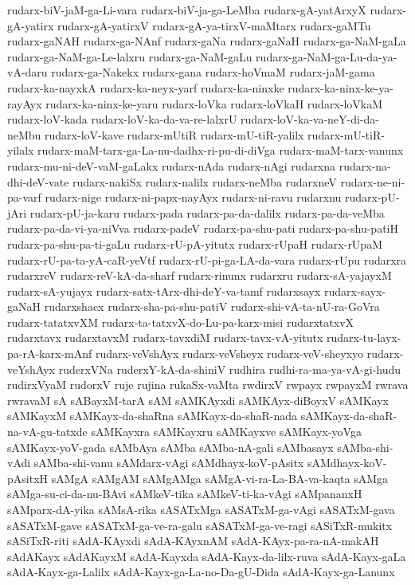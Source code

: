 {rudarx-biV-jaM-ga-Li-vara
rudarx-biV-ja-ga-LeMba
rudarx-gA-yatArxyX
rudarx-gA-yatirx
rudarx-gA-yatirxV
rudarx-gA-ya-tirxV-maMtarx
rudarx-gaMTu
rudarx-gaNAH
rudarx-ga-NAnf
rudarx-gaNa
rudarx-gaNaH
rudarx-ga-NaM-gaLa
rudarx-ga-NaM-ga-Le-lalxru
rudarx-ga-NaM-gaLu
rudarx-ga-NaM-ga-Lu-da-ya-vA-daru
rudarx-ga-Nakekx
rudarx-gana
rudarx-hoVmaM
rudarx-jaM-gama
rudarx-ka-nayxkA
rudarx-ka-neyx-yarf
rudarx-ka-ninxke
rudarx-ka-ninx-ke-ya-rayAyx
rudarx-ka-ninx-ke-yaru
rudarx-loVka
rudarx-loVkaH
rudarx-loVkaM
rudarx-loV-kada
rudarx-loV-ka-da-va-re-lalxrU
rudarx-loV-ka-va-neY-di-da-neMbu
rudarx-loV-kave
rudarx-mUtiR
rudarx-mU-tiR-yalilx
rudarx-mU-tiR-yilalx
rudarx-maM-tarx-ga-La-nu-dadhx-ri-pu-di-diVga
rudarx-maM-tarx-vanunx
rudarx-mu-ni-deV-vaM-gaLakx
rudarx-nAda
rudarx-nAgi
rudarxna
rudarx-na-dhi-deV-vate
rudarx-nakiSx
rudarx-nalilx
rudarx-neMba
rudarxneV
rudarx-ne-ni-pa-varf
rudarx-nige
rudarx-ni-papx-nayAyx
rudarx-ni-ravu
rudarxnu
rudarx-pU-jAri
rudarx-pU-ja-karu
rudarx-pada
rudarx-pa-da-dalilx
rudarx-pa-da-veMba
rudarx-pa-da-vi-ya-niVva
rudarx-padeV
rudarx-pa-shu-pati
rudarx-pa-shu-patiH
rudarx-pa-shu-pa-ti-gaLu
rudarx-rU-pA-yitutx
rudarx-rUpaH
rudarx-rUpaM
rudarx-rU-pa-ta-yA-caR-yeVtf
rudarx-rU-pi-ga-LA-da-vara
rudarx-rUpu
rudarxra
rudarxreV
rudarx-reV-kA-da-sharf
rudarx-rinunx
rudarxru
rudarx-sA-yajayxM
rudarx-sA-yujayx
rudarx-satx-tArx-dhi-deY-va-tamf
rudarxsayx
rudarx-sayx-gaNaH
rudarxshacx
rudarx-sha-pa-shu-patiV
rudarx-shi-vA-ta-nU-ra-GoVra
rudarx-tatatxvXM
rudarx-ta-tatxvX-do-Lu-pa-karx-misi
rudarxtatxvX
rudarxtavx
rudarxtavxM
rudarx-tavxdiM
rudarx-tavx-vA-yitutx
rudarx-tu-layx-pa-rA-karx-mAnf
rudarx-veVshAyx
rudarx-veVsheyx
rudarx-veV-sheyxyo
rudarx-veYshAyx
ruderxVNa
ruderxY-kA-da-shiniV
rudhira
rudhi-ra-ma-ya-vA-gi-hudu
rudirxVyaM
rudorxV
ruje
rujina
rukaSx-vaMta
rwdirxV
rwpayx
rwpayxM
rwrava
rwravaM
sA
sABayxM-tarA
sAM
sAMKAyxdi
sAMKAyx-diBoyxV
sAMKayx
sAMKayxM
sAMKayx-da-shaRna
sAMKayx-da-shaR-nada
sAMKayx-da-shaR-na-vA-gu-tatxde
sAMKayxra
sAMKayxru
sAMKayxve
sAMKayx-yoVga
sAMKayx-yoV-gada
sAMbAya
sAMba
sAMba-nA-gali
sAMbasayx
sAMba-shi-vAdi
sAMba-shi-vanu
sAMdarx-vAgi
sAMdhayx-koV-pAsitx
sAMdhayx-koV-pAsitxH
sAMgA
sAMgAM
sAMgAMga
sAMgA-vi-ra-La-BA-va-kaqta
sAMga
sAMga-su-ci-da-nu-BAvi
sAMkeV-tika
sAMkeV-ti-ka-vAgi
sAMpananxH
sAMparx-dA-yika
sAMsA-rika
sASATxMga
sASATxM-ga-vAgi
sASATxM-gava
sASATxM-gave
sASATxM-ga-ve-ra-galu
sASATxM-ga-ve-ragi
sASiTxR-mukitx
sASiTxR-riti
sAdA-KAyxdi
sAdA-KAyxnAM
sAdA-KAyx-pa-ra-nA-makAH
sAdAKayx
sAdAKayxM
sAdA-Kayxda
sAdA-Kayx-da-lilx-ruva
sAdA-Kayx-gaLa
sAdA-Kayx-ga-Lalilx
sAdA-Kayx-ga-La-no-Da-gU-Dida
sAdA-Kayx-ga-Lanunx
}
